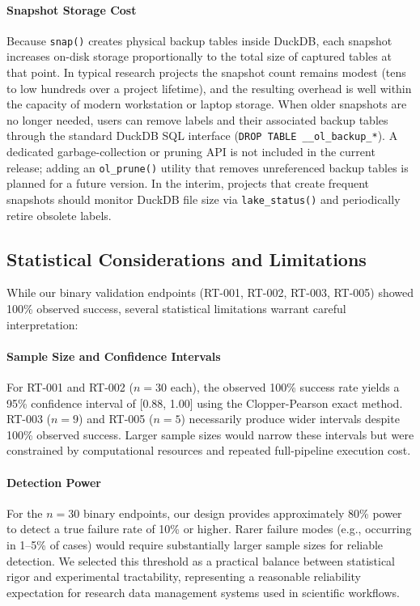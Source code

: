 \documentclass[11pt,a4paper]{article}
\begin{document}
\paragraph{Snapshot Storage Cost}
Because \texttt{snap()} creates physical backup tables inside DuckDB, each snapshot increases on-disk storage proportionally to the total size of captured tables at that point. In typical research projects the snapshot count remains modest (tens to low hundreds over a project lifetime), and the resulting overhead is well within the capacity of modern workstation or laptop storage. When older snapshots are no longer needed, users can remove labels and their associated backup tables through the standard DuckDB SQL interface (\texttt{DROP TABLE \_\_ol\_backup\_*}). A dedicated garbage-collection or pruning API is not included in the current release; adding an \texttt{ol\_prune()} utility that removes unreferenced backup tables is planned for a future version. In the interim, projects that create frequent snapshots should monitor DuckDB file size via \texttt{lake\_status()} and periodically retire obsolete labels.

\subsection{Statistical Considerations and Limitations}

While our binary validation endpoints (RT-001, RT-002, RT-003, RT-005) showed 100\% observed success, several statistical limitations warrant careful interpretation:

\paragraph{Sample Size and Confidence Intervals}
For RT-001 and RT-002 ($n = 30$ each), the observed 100\% success rate yields a 95\% confidence interval of [0.88, 1.00] using the Clopper-Pearson exact method. RT-003 ($n=9$) and RT-005 ($n=5$) necessarily produce wider intervals despite 100\% observed success. Larger sample sizes would narrow these intervals but were constrained by computational resources and repeated full-pipeline execution cost.

\paragraph{Detection Power}
For the $n=30$ binary endpoints, our design provides approximately 80\% power to detect a true failure rate of 10\% or higher. Rarer failure modes (e.g., occurring in 1--5\% of cases) would require substantially larger sample sizes for reliable detection. We selected this threshold as a practical balance between statistical rigor and experimental tractability, representing a reasonable reliability expectation for research data management systems used in scientific workflows.
\end{document}
